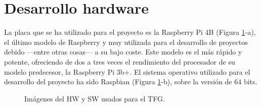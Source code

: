 \section{Desarrollo hardware}
\label{sec:deshw}
La placa que se ha utilizado para el proyecto es la Raspberry Pi 4B (Figura \ref{fig:rasp}-a), el último modelo de Raspberry y muy utilizada para el desarrollo de proyectos debido ---entre otras cosas--- a su bajo coste. Este modelo es el más rápido y potente, ofreciendo de dos a tres veces el rendimiento del procesador de su modelo predecesor, la Raspberry Pi 3b+. El sistema operativo utilizado para el desarrollo del proyecto ha sido Raspbian (Figura \ref{fig:rasp}-b), sobre la versión de 64 bits.\\
\begin{figure}[h!]
  \begin{center}
    \hspace{1mm}
  \end{center}
\caption{Imágenes del HW y SW usados para el TFG.} \label{fig:rasp}
\end{figure}

